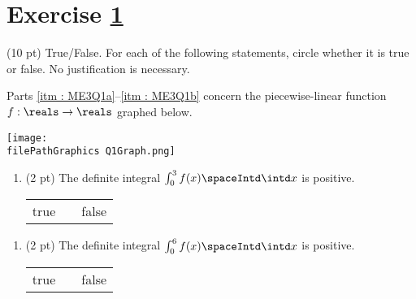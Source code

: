 %
%
%
%


\section{Exercise \ref{sec : Math112 Spring2022 MockExam3 Q1}}
\label{sec : Math112 Spring2022 MockExam3 Q1}

(10 pt) True/False. For each of the following statements, circle whether it is true or false. No justification is necessary.

Parts \ref{itm : ME3Q1a}--\ref{itm : ME3Q1b} concern the piecewise-linear function $f : \reals \rightarrow \reals$ graphed below.
\begin{center}
\texttt{[image: \\filePathGraphics Q1Graph.png]}
\end{center}

\begin{enumerate}[label=(\alph*)]
\item\label{itm : ME3Q1a} (2 pt) The definite integral $\int_{0}^{3} f(x) \spaceIntd \intd x$ is positive.
\begin{center}
\begin{tabular}{c c c}
true	&	\hspace{1in}	&	false
\end{tabular}
\end{center}
\end{enumerate}




\begin{enumerate}[resume,label=(\alph*)]
\item\label{itm : ME3Q1b} (2 pt) The definite integral $\int_{0}^{6} f(x) \spaceIntd \intd x$ is positive.
\begin{center}
\begin{tabular}{c c c}
true	&	\hspace{1in}	&	false
\end{tabular}
\end{center}
\end{enumerate}

